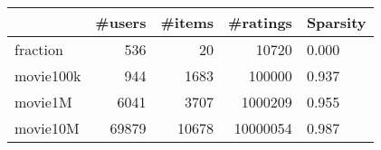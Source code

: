 \begin{tabular}{lrrrl}
\toprule
{} &  \#users &  \#items &  \#ratings & Sparsity \\
\midrule
fraction  &     536 &      20 &     10720 &    0.000 \\
movie100k &     944 &    1683 &    100000 &    0.937 \\
movie1M   &    6041 &    3707 &   1000209 &    0.955 \\
movie10M  &   69879 &   10678 &  10000054 &    0.987 \\
\bottomrule
\end{tabular}
